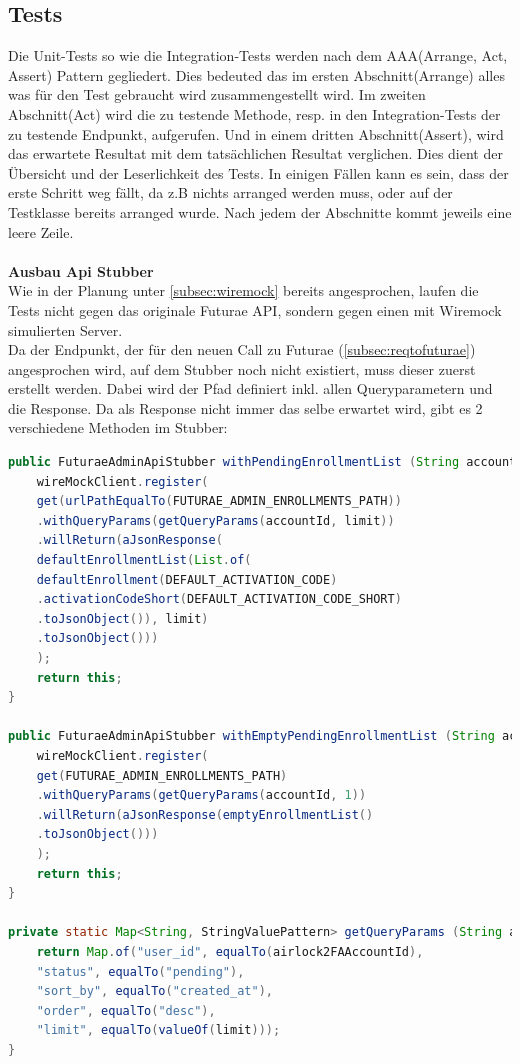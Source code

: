 \subsection{Tests}\label{subsec:testbackend}
Die Unit-Tests so wie die Integration-Tests werden nach dem AAA(Arrange, Act, Assert) Pattern gegliedert. Dies bedeuted das im ersten Abschnitt(Arrange) alles was für den Test gebraucht wird zusammengestellt wird. Im zweiten Abschnitt(Act) wird die zu testende Methode, resp. in den Integration-Tests der zu testende Endpunkt, aufgerufen. Und in einem dritten Abschnitt(Assert), wird das erwartete Resultat mit dem tatsächlichen Resultat verglichen. Dies dient der Übersicht und der Leserlichkeit des Tests. In einigen Fällen kann es sein, dass der erste Schritt weg fällt, da z.B nichts arranged werden muss, oder auf der Testklasse bereits arranged wurde. Nach jedem der Abschnitte kommt jeweils eine leere Zeile. \\
\\
\textbf{Ausbau Api Stubber}\label{head:stubber}\\
Wie in der Planung unter \ref{subsec:wiremock} bereits angesprochen, laufen die Tests nicht gegen das originale Futurae API, sondern gegen einen mit Wiremock simulierten Server.\\
Da der Endpunkt, der für den neuen Call zu Futurae (\ref{subsec:reqtofuturae}) angesprochen wird, auf dem Stubber noch nicht existiert, muss dieser zuerst erstellt werden. Dabei wird der Pfad definiert inkl. allen Queryparametern und die Response. Da als Response nicht immer das selbe erwartet wird, gibt es 2 verschiedene Methoden im Stubber:
\begin{lstlisting}[language=Java]
	public FuturaeAdminApiStubber withPendingEnrollmentList (String accountId, int limit) {
	wireMockClient.register(
	get(urlPathEqualTo(FUTURAE_ADMIN_ENROLLMENTS_PATH))
	.withQueryParams(getQueryParams(accountId, limit))
	.willReturn(aJsonResponse(
	defaultEnrollmentList(List.of(
	defaultEnrollment(DEFAULT_ACTIVATION_CODE)
	.activationCodeShort(DEFAULT_ACTIVATION_CODE_SHORT)
	.toJsonObject()), limit)
	.toJsonObject()))
	);
	return this;
}

public FuturaeAdminApiStubber withEmptyPendingEnrollmentList (String accountId) {
	wireMockClient.register(
	get(FUTURAE_ADMIN_ENROLLMENTS_PATH)
	.withQueryParams(getQueryParams(accountId, 1))
	.willReturn(aJsonResponse(emptyEnrollmentList()
	.toJsonObject()))
	);
	return this;
}

private static Map<String, StringValuePattern> getQueryParams (String airlock2FAAccountId, int limit) {
	return Map.of("user_id", equalTo(airlock2FAAccountId),
	"status", equalTo("pending"),
	"sort_by", equalTo("created_at"),
	"order", equalTo("desc"),
	"limit", equalTo(valueOf(limit)));
}
\end{lstlisting}
